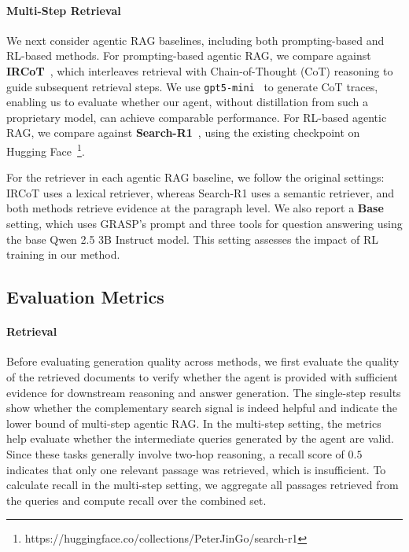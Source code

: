 \documentclass[11pt]{article}
\begin{document}
\paragraph{Multi-Step Retrieval}
We next consider agentic RAG baselines, including both prompting-based and RL-based methods. For prompting-based agentic RAG, we compare against \textbf{IRCoT}~\cite{trivedi2023interleaving}, which interleaves retrieval with Chain-of-Thought (CoT) reasoning to guide subsequent retrieval steps. We use \texttt{gpt5-mini}~\cite{openai2026gpt5mini} to generate CoT traces, enabling us to evaluate whether our agent, without distillation from such a proprietary model, can achieve comparable performance. For RL-based agentic RAG, we compare against \textbf{Search-R1}~\cite{jin2025search}, using the existing checkpoint on Hugging Face~\footnote{https://huggingface.co/collections/PeterJinGo/search-r1}.

For the retriever in each agentic RAG baseline, we follow the original settings: IRCoT uses a lexical retriever, whereas Search-R1 uses a semantic retriever, and both methods retrieve evidence at the paragraph level. We also report a \textbf{Base} setting, which uses GRASP’s prompt and three tools for question answering using the base Qwen 2.5 3B Instruct model. This setting assesses the impact of RL training in our method.


\subsection{Evaluation Metrics}

\paragraph{Retrieval}
Before evaluating generation quality across methods, we first evaluate the quality of the retrieved documents to verify whether the agent is provided with sufficient evidence for downstream reasoning and answer generation. The single-step results show whether the complementary search signal is indeed helpful and indicate the lower bound of multi-step agentic RAG. In the multi-step setting, the metrics help evaluate whether the intermediate queries generated by the agent are valid. Since these tasks generally involve two-hop reasoning, a recall score of $0.5$ indicates that only one relevant passage was retrieved, which is insufficient. To calculate recall in the multi-step setting, we aggregate all passages retrieved from the queries and compute recall over the combined set.
\end{document}
